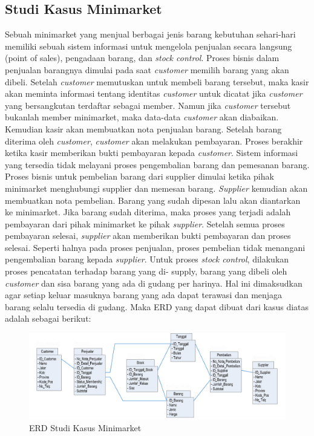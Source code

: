 	\subsection*{Studi Kasus Minimarket}
	Sebuah minimarket yang menjual berbagai jenis barang kebutuhan sehari-hari
	memiliki sebuah sistem informasi untuk mengelola penjualan secara langsung
	(point of sales), pengadaan barang, dan \textit{stock control}. Proses bisnis dalam penjualan barangnya dimulai pada saat \textit{customer} memilih barang yang akan dibeli. Setelah \textit{customer} memutuskan untuk membeli barang tersebut, maka kasir akan meminta informasi tentang identitas \textit{customer} untuk dicatat jika \textit{customer} yang bersangkutan terdaftar sebagai member. Namun jika \textit{customer} tersebut bukanlah member minimarket, maka data-data \textit{customer} akan diabaikan. Kemudian kasir akan membuatkan nota penjualan barang. Setelah barang diterima oleh \textit{customer}, \textit{customer} akan melakukan pembayaran. Proses berakhir ketika kasir memberikan bukti pembayaran kepada \textit{customer}. Sistem informasi yang tersedia tidak melayani proses pengembalian barang dan pemesanan barang. 
	Proses bisnis untuk pembelian barang dari supplier dimulai ketika pihak minimarket menghubungi supplier dan memesan barang. \textit{Supplier} kemudian akan membuatkan nota pembelian. Barang yang sudah dipesan lalu akan diantarkan ke minimarket.  Jika  barang  sudah  diterima,  maka  proses  yang  terjadi  adalah pembayaran dari pihak minimarket ke pihak \textit{supplier}. Setelah semua proses pembayaran  selesai,  \textit{supplier}  akan  memberikan  bukti  pembayaran  dan  proses selesai. Seperti halnya pada proses penjualan, proses pembelian tidak menangani pengembalian barang kepada \textit{supplier}. 
	Untuk proses \textit{stock control}, dilakukan proses pencatatan terhadap barang yang di- supply, barang yang dibeli oleh \textit{customer} dan sisa barang yang ada di gudang per harinya. Hal ini dimaksudkan agar setiap keluar masuknya barang yang ada dapat terawasi dan menjaga barang selalu tersedia di gudang. 
	Maka ERD yang dapat dibuat dari kasus diatas adalah sebagai berikut:
	\begin{figure}[H]
		\centering
		\includegraphics[width=1.1\textwidth]{gambar/erd/sample-erd}
		\caption{ERD Studi Kasus Minimarket}
	\end{figure}
	
